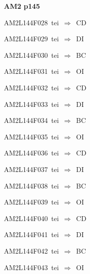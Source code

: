 \par\vfill\eject
{\bf\hfill AM2 p145\hfill\hbox{}}\par\bigskip
{\sixrm AM2L144F028\ {\sixit tei}\ }$\Rightarrow$\ {\tenit CD}\par\smallskip
{\sixrm AM2L144F029\ {\sixit tei}\ }$\Rightarrow$\ {\tenit DI}\par\smallskip
{\sixrm AM2L144F030\ {\sixit tei}\ }$\Rightarrow$\ {\tenit BC}\par\smallskip
{\sixrm AM2L144F031\ {\sixit tei}\ }$\Rightarrow$\ {\tenit OI}\par\smallskip
{\sixrm AM2L144F032\ {\sixit tei}\ }$\Rightarrow$\ {\tenit CD}\par\smallskip
{\sixrm AM2L144F033\ {\sixit tei}\ }$\Rightarrow$\ {\tenit DI}\par\smallskip
{\sixrm AM2L144F034\ {\sixit tei}\ }$\Rightarrow$\ {\tenit BC}\par\smallskip
{\sixrm AM2L144F035\ {\sixit tei}\ }$\Rightarrow$\ {\tenit OI}\par\smallskip
{\sixrm AM2L144F036\ {\sixit tei}\ }$\Rightarrow$\ {\tenit CD}\par\smallskip
{\sixrm AM2L144F037\ {\sixit tei}\ }$\Rightarrow$\ {\tenit DI}\par\smallskip
{\sixrm AM2L144F038\ {\sixit tei}\ }$\Rightarrow$\ {\tenit BC}\par\smallskip
{\sixrm AM2L144F039\ {\sixit tei}\ }$\Rightarrow$\ {\tenit OI}\par\smallskip
{\sixrm AM2L144F040\ {\sixit tei}\ }$\Rightarrow$\ CD\par\smallskip
{\sixrm AM2L144F041\ {\sixit tei}\ }$\Rightarrow$\ DI\par\smallskip
{\sixrm AM2L144F042\ {\sixit tei}\ }$\Rightarrow$\ BC\par\smallskip
{\sixrm AM2L144F043\ {\sixit tei}\ }$\Rightarrow$\ OI\par\smallskip

